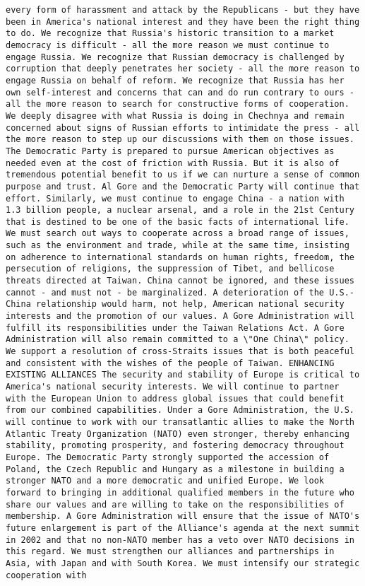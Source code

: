 \documentclass[
]{article}
\begin{document}
\begin{verbatim}
every form of harassment and attack by the Republicans - but they have been in America's national interest and they have been the right thing to do. We recognize that Russia's historic transition to a market democracy is difficult - all the more reason we must continue to engage Russia. We recognize that Russian democracy is challenged by corruption that deeply penetrates her society - all the more reason to engage Russia on behalf of reform. We recognize that Russia has her own self-interest and concerns that can and do run contrary to ours - all the more reason to search for constructive forms of cooperation. We deeply disagree with what Russia is doing in Chechnya and remain concerned about signs of Russian efforts to intimidate the press - all the more reason to step up our discussions with them on those issues. The Democratic Party is prepared to pursue American objectives as needed even at the cost of friction with Russia. But it is also of tremendous potential benefit to us if we can nurture a sense of common purpose and trust. Al Gore and the Democratic Party will continue that effort. Similarly, we must continue to engage China - a nation with 1.3 billion people, a nuclear arsenal, and a role in the 21st Century that is destined to be one of the basic facts of international life. We must search out ways to cooperate across a broad range of issues, such as the environment and trade, while at the same time, insisting on adherence to international standards on human rights, freedom, the persecution of religions, the suppression of Tibet, and bellicose threats directed at Taiwan. China cannot be ignored, and these issues cannot - and must not - be marginalized. A deterioration of the U.S.-China relationship would harm, not help, American national security interests and the promotion of our values. A Gore Administration will fulfill its responsibilities under the Taiwan Relations Act. A Gore Administration will also remain committed to a \"One China\" policy. We support a resolution of cross-Straits issues that is both peaceful and consistent with the wishes of the people of Taiwan. ENHANCING EXISTING ALLIANCES The security and stability of Europe is critical to America's national security interests. We will continue to partner with the European Union to address global issues that could benefit from our combined capabilities. Under a Gore Administration, the U.S. will continue to work with our transatlantic allies to make the North Atlantic Treaty Organization (NATO) even stronger, thereby enhancing stability, promoting prosperity, and fostering democracy throughout Europe. The Democratic Party strongly supported the accession of Poland, the Czech Republic and Hungary as a milestone in building a stronger NATO and a more democratic and unified Europe. We look forward to bringing in additional qualified members in the future who share our values and are willing to take on the responsibilities of membership. A Gore Administration will ensure that the issue of NATO's future enlargement is part of the Alliance's agenda at the next summit in 2002 and that no non-NATO member has a veto over NATO decisions in this regard. We must strengthen our alliances and partnerships in Asia, with Japan and with South Korea. We must intensify our strategic cooperation with 
\end{verbatim}
\end{document}
